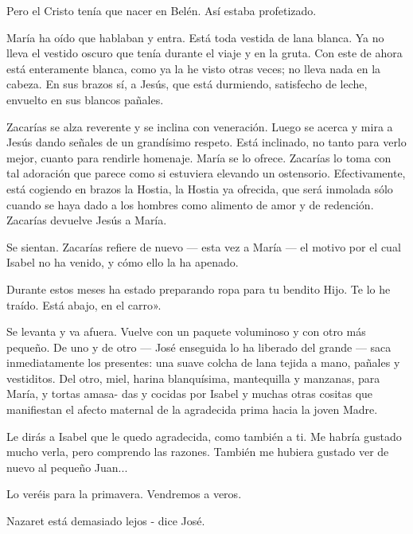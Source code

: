 \documentclass[12pt, twoside, openright]{book} %
\begin{document}
Pero el Cristo tenía que nacer en Belén. Así estaba profetizado. 

María ha oído que hablaban y entra. Está toda vestida de lana blanca. Ya no lleva el vestido oscuro que tenía durante el viaje y en la gruta. Con este de ahora está enteramente blanca, como ya la he visto otras veces; no lleva nada en la cabeza. En sus brazos sí, a Jesús, que está durmiendo, satisfecho de leche, envuelto en sus blancos pañales. 

Zacarías se alza reverente y se inclina con veneración. Luego se acerca y mira a Jesús dando señales de un grandísimo respeto. Está inclinado, no tanto para verlo mejor, cuanto para rendirle homenaje. María se lo ofrece. Zacarías lo toma con tal adoración que parece como si estuviera elevando un ostensorio. Efectivamente, está cogiendo en brazos la Hostia, la Hostia ya ofrecida, que será inmolada sólo cuando se haya dado a los hombres como alimento de amor y de redención. Zacarías devuelve Jesús a María. 

Se sientan. Zacarías refiere de nuevo — esta vez a María — el motivo por el cual Isabel no ha venido, y cómo ello la ha apenado. 

Durante estos meses ha estado preparando ropa para tu bendito Hijo. Te lo he traído. Está abajo, en el carro». 

Se levanta y va afuera. Vuelve con un paquete voluminoso y con otro más pequeño. De uno y de otro — José enseguida lo ha liberado del grande — saca inmediatamente los presentes: una suave colcha de lana tejida a mano, pañales y vestiditos. Del otro, miel, harina blanquísima, mantequilla y manzanas, para María, y tortas amasa- das y cocidas por Isabel y muchas otras cositas que manifiestan el afecto maternal de la agradecida prima hacia la joven Madre. 

Le dirás a Isabel que le quedo agradecida, como también a ti. Me habría gustado mucho verla, pero comprendo las razones. También me hubiera gustado ver de nuevo al pequeño Juan... 

Lo veréis para la primavera. Vendremos a veros. 

Nazaret está demasiado lejos - dice José. 
\end{document}
